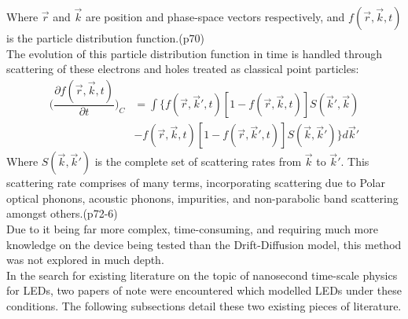 \documentclass[titlepage]{article}
\begin{document}
Where $\vec{r}$ and $\vec{k}$ are position and phase-space vectors respectively, and $f(\vec{r},\vec{k},t)$ is the particle distribution function.\cite{NSD}(p70)\\
The evolution of this particle distribution function in time is handled through scattering of these electrons and holes treated as classical point particles:
\begin{eqnarray}
\Big(\dfrac{\partial f(\vec{r},\vec{k},t)}{\partial t}\Big)_C & = \int\{f(\vec{r},\vec{k}',t)[1-f(\vec{r},\vec{k},t)]S(\vec{k}',\vec{k})\\
&-f(\vec{r},\vec{k},t)[1-f(\vec{r},\vec{k}',t)]S(\vec{k},\vec{k}')\}d\vec{k}'
\end{eqnarray}
Where $S(\vec{k},\vec{k}')$ is the complete set of scattering rates from $\vec{k}$ to $\vec{k}'$. This scattering rate comprises of many terms, incorporating scattering due to Polar optical phonons, acoustic phonons, impurities, and non-parabolic band scattering amongst others.\cite{NSD}(p72-6)\\
Due to it being far more complex, time-consuming, and requiring much more knowledge on the device being tested than the Drift-Diffusion model, this method was not explored in much depth.\\
In the search for existing literature on the topic of nanosecond time-scale physics for LEDs, two papers of note were encountered which modelled LEDs under these conditions. The following subsections detail these two existing pieces of literature.
\end{document}
